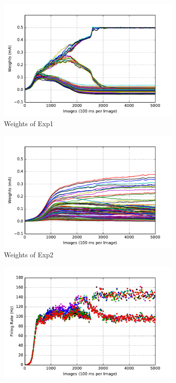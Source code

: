 \begin{figure}
	\centering
	\begin{subfigure}[t]{0.4\textwidth}
		\includegraphics[width=\textwidth]{pics_sdlm/11_exp_SRBM_Orig_long/exp1_weights_s.pdf}
		\caption{Weights of Exp1}
	\end{subfigure}
	\begin{subfigure}[t]{0.4\textwidth}
		\includegraphics[width=\textwidth]{pics_sdlm/11_exp_SRBM_Orig_long/exp2_weights_s.pdf}
		\caption{Weights of Exp2}
	\end{subfigure}
	\begin{subfigure}[t]{0.4\textwidth}
		\includegraphics[width=\textwidth]{pics_sdlm/11_exp_SRBM_Orig_long/exp1_recon_s.pdf}

\end{subfigure}
\end{figure}
